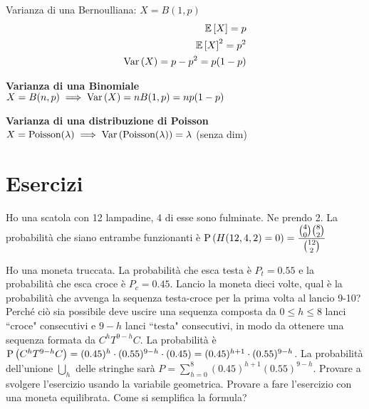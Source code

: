\begin{exmp}
	Varianza di una Bernoulliana: $ X = B(1,p) $
	\begin{equation*}
	\begin{aligned}
		\mathbb{E}\left[X\right] = p \\
		\mathbb{E}\left[X\right]^2 = p^2 \\
		\text{Var}\left(X\right) = p-p^2 = p(1-p)
	\end{aligned}
	\end{equation*}
\end{exmp}

\begin{exmp}
    \textbf{Varianza di una Binomiale} \\
	$ X = B(n,p) \implies \text{Var}\left(X\right) = nB(1,p) = np(1-p) $
\end{exmp}

\begin{exmp}
    \textbf{Varianza di una distribuzione di Poisson} \\
	$ X = \text{Poisson}(\lambda)  \implies  \text{Var}\left(\text{Poisson}(\lambda)\right) = \lambda $
	(senza dim)
\end{exmp}





\section{Esercizi}

\begin{exrc}
    Ho una scatola con 12 lampadine, 4 di esse sono fulminate. Ne prendo 2. La probabilit\`a  che siano entrambe funzionanti \`e $ \text{P}\left(H(12, 4, 2) = 0\right) = \dfrac{\binom{4}{0}\binom{8}{2}}{\binom{12}{2}} $
\end{exrc}
\begin{exrc}
    Ho una moneta truccata. La probabilit\`a  che esca testa \`e $ P_t = 0.55 $ e la probabilit\`a  che esca croce \`e $ P_c = 0.45 $. Lancio la moneta dieci volte, qual \`e la probabilit\`a  che avvenga la sequenza testa-croce per la prima volta al lancio 9-10? Perch\'e ci\`o  sia possibile deve uscire una sequenza composta da $ 0 \leq h \leq 8 $ lanci ``croce" consecutivi e $ 9-h $ lanci  ``testa" consecutivi, in modo da ottenere una sequenza formata da $ C^hT^{9-h}C $. La probabilit\`a  \`e $ \text{P}\left(C^hT^{9-h}C\right) = (0.45)^h \cdot (0.55)^{9-h} \cdot (0.45) = (0.45)^{h+1} \cdot (0.55)^{9-h}$. La probabilit\`a  dell'unione $ \bigcup_{h} $ delle stringhe sar\`a  $ P = \sum_{h=0}^8(0.45)^{h+1}(0.55)^{9-h}$. Provare a svolgere l'esercizio usando la  variabile geometrica. Provare a fare l'esercizio con una moneta equilibrata. Come si semplifica la formula?


\end{exrc}

